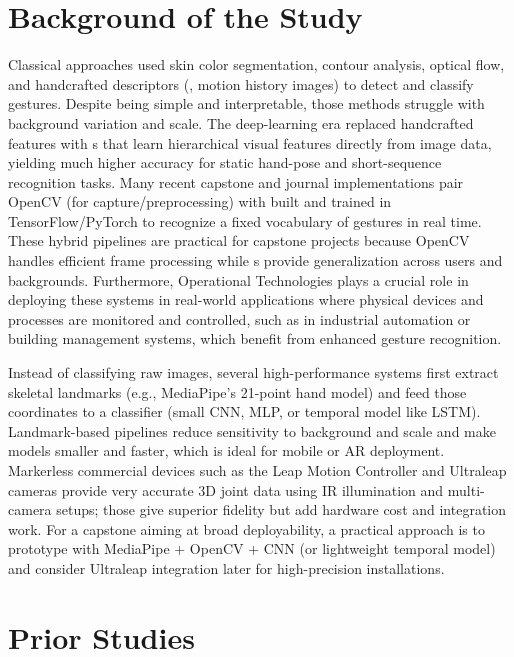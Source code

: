 
\section{Background of the Study}

Classical  approaches used skin color segmentation, contour analysis, optical flow, and handcrafted descriptors (, motion history images) to detect and classify gestures. Despite being simple and interpretable, those methods struggle with background variation and scale. The deep-learning era replaced handcrafted features with s that learn hierarchical visual features directly from image data, yielding much higher accuracy for static hand-pose and short-sequence recognition tasks. Many recent capstone and journal implementations pair \gls{OpenCV} (for capture/preprocessing) with  built and trained in TensorFlow/PyTorch to recognize a fixed vocabulary of gestures in real time. These hybrid pipelines are practical for capstone projects because OpenCV handles efficient frame processing while s provide generalization across users and backgrounds. Furthermore, \gls{Operational Technologies} plays a crucial role in deploying these systems in real-world applications where physical devices and processes are monitored and controlled, such as in industrial automation or building management systems, which benefit from enhanced gesture recognition. \citep{oudah2020hand}

Instead of classifying raw images, several high-performance systems first extract skeletal landmarks (e.g., MediaPipe’s 21-point hand model) and feed those coordinates to a classifier (small CNN, MLP, or temporal model like LSTM). Landmark-based pipelines reduce sensitivity to background and scale and make models smaller and faster, which is ideal for mobile or AR deployment. Markerless commercial devices such as the Leap Motion Controller and \gls{Ultraleap} cameras provide very accurate 3D joint data using IR illumination and multi-camera setups; those give superior fidelity but add hardware cost and integration work. For a capstone aiming at broad deployability, a practical approach is to prototype with MediaPipe + OpenCV + CNN (or lightweight temporal model) and consider Ultraleap integration later for high-precision installations. \citep{zhangmediapipe}

\section{Prior Studies}

